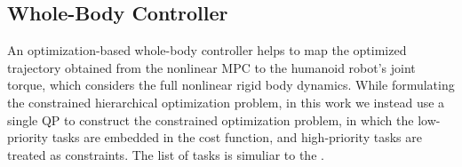 \documentclass[a4paper, 10pt, conference]{ieeeconf}      %
\begin{document}


\subsection{Whole-Body Controller}
An optimization-based whole-body controller helps to map the optimized trajectory obtained from the nonlinear MPC to the humanoid robot's joint torque, which considers the full nonlinear rigid body dynamics. While formulating the constrained hierarchical optimization problem, in this work we instead use a single QP to construct the constrained optimization problem, in which the low-priority tasks are embedded in the cost function, and high-priority tasks are treated as constraints. The list of tasks is simuliar to the \cite{c4,c39}.

\end{document}

